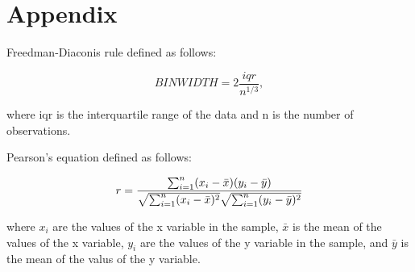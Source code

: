 \documentclass[12pt, letterpaper, titlepage]{article}
\begin{document}
\section{Appendix}
\label{sec:apx}

Freedman-Diaconis rule defined as follows:

\begin{equation}
  \label{eq:freedman-diaconis}
  BIN WIDTH = 2 \frac{iqr}{n^{1/3}},
\end{equation}

where iqr is the interquartile range of the data and n is the number of observations.

Pearson's equation defined as follows:

\begin{equation}
  \label{eq:pearson}
  r = \frac{ \sum_{i=1}^{n}(x_i-\bar{x})(y_i-\bar{y}) }{%
  \sqrt{\sum_{i=1}^{n}(x_i-\bar{x})^2}\sqrt{\sum_{i=1}^{n}(y_i-\bar{y})^2}}
\end{equation}

where \begin{math}x_{i}\end{math} are the values of the x variable in the sample, \begin{math}\bar{x}\end{math}
 is the mean of the values of the x variable, \begin{math}y_{i}\end{math} are the values of the y variable in 
 the sample, and \begin{math}\bar{y}\end{math} is the mean of the valus of the y variable.
\end{document}

